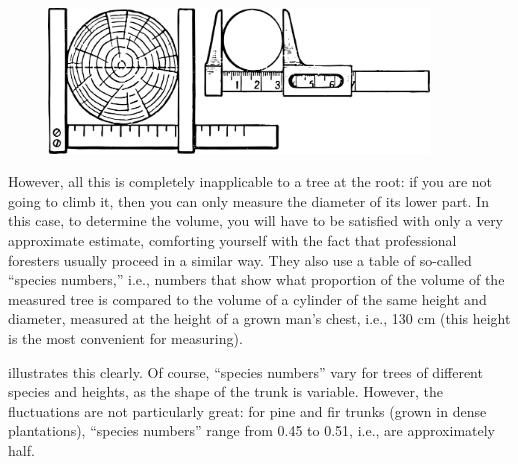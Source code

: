 \begin{figure}[h!]
\centering
\includegraphics[width=0.9\textwidth]{figures/ch-01/fig-01-20.pdf}
\end{figure}

However, all this is completely inapplicable to a tree at the root: if you are not going to climb it, then you can only measure the diameter of its lower part. In this case, to determine the volume, you will have to be satisfied with only a very approximate estimate, comforting yourself with the fact that professional foresters usually proceed in a similar way. They also use a table of so-called ``species numbers,'' i.e., numbers that show what proportion of the volume of the measured tree is compared to the volume of a cylinder of the same height and diameter, measured at the height of a grown man's chest, i.e., 130 cm (this height is the most convenient for measuring). 

 illustrates this clearly. Of course, ``species numbers'' vary for trees of different species and heights, as the shape of the trunk is variable. However, the fluctuations are not particularly great: for pine and fir trunks (grown in dense plantations), ``species numbers'' range from 0.45 to 0.51, i.e., are approximately half.

